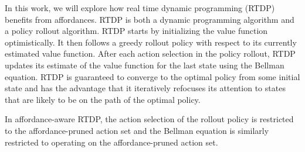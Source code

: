 \documentclass[]{article}
\begin{document}
In this work, we will explore how real time dynamic programming
(RTDP)~\citep{barto95} benefits from affordances. RTDP is both a
dynamic programming algorithm and a policy rollout algorithm. RTDP
starts by initializing the value function optimistically. It then
follows a greedy rollout policy with respect to its currently estimated
value function. After each
action selection in the policy rollout, RTDP updates its estimate of
the value function for the last state using the Bellman equation. RTDP
is guaranteed to converge to the optimal policy from some initial
state and has the advantage that it iteratively refocuses its
attention to states that are likely to be on the path of the optimal
policy.

In affordance-aware RTDP, the action selection of the rollout policy
is restricted to the affordance-pruned action set and the Bellman
equation is similarly restricted to operating on the affordance-pruned
action set.



%
%


%
\end{document}
